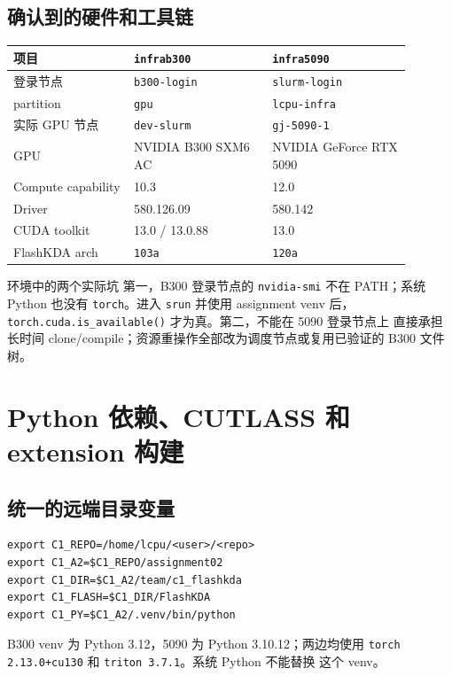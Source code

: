 \documentclass[11pt,a4paper,fontset=none]{ctexart}
\newcommand{\code}[1]{\texttt{#1}}
\begin{document}
\subsection{确认到的硬件和工具链}

\begin{longtable}{@{}L{0.27\linewidth}L{0.31\linewidth}L{0.31\linewidth}@{}}
\toprule
项目 & \code{infrab300} & \code{infra5090} \\
\midrule
\endhead
\bottomrule
\endlastfoot
登录节点 & \code{b300-login} & \code{slurm-login} \\
partition & \code{gpu} & \code{lcpu-infra} \\
实际 GPU 节点 & \code{dev-slurm} & \code{gj-5090-1} \\
GPU & NVIDIA B300 SXM6 AC & NVIDIA GeForce RTX 5090 \\
Compute capability & 10.3 & 12.0 \\
Driver & 580.126.09 & 580.142 \\
CUDA toolkit & 13.0 / 13.0.88 & 13.0 \\
FlashKDA arch & \code{103a} & \code{120a} \\
\end{longtable}

\begin{record}{环境中的两个实际坑}
第一，B300 登录节点的 \code{nvidia-smi} 不在 PATH；系统 Python 也没有
\code{torch}。进入 \code{srun} 并使用 assignment venv 后，
\code{torch.cuda.is\_available()} 才为真。第二，不能在 5090 登录节点上
直接承担长时间 clone/compile；资源重操作全部改为调度节点或复用已验证的
B300 文件树。
\end{record}

\section{Python 依赖、CUTLASS 和 extension 构建}

\subsection{统一的远端目录变量}

\begin{lstlisting}
export C1_REPO=/home/lcpu/<user>/<repo>
export C1_A2=$C1_REPO/assignment02
export C1_DIR=$C1_A2/team/c1_flashkda
export C1_FLASH=$C1_DIR/FlashKDA
export C1_PY=$C1_A2/.venv/bin/python
\end{lstlisting}

B300 venv 为 Python 3.12，5090 为 Python 3.10.12；两边均使用
\code{torch 2.13.0+cu130} 和 \code{triton 3.7.1}。系统 Python 不能替换
这个 venv。
\end{document}
